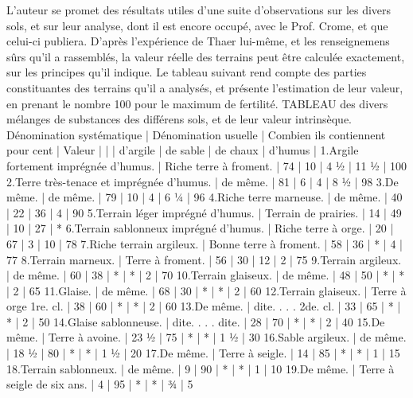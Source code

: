 L'auteur se promet des résultats utiles d'une suite d'observations sur les divers sols, et sur leur analyse, dont il est encore occupé, avec le Prof. Crome, et que celui-ci publiera. D'après l'expérience de Thaer lui-même, et les renseignemens sûrs qu'il a rassemblés, la valeur réelle des terrains peut être calculée exactement, sur les principes qu'il indique. Le tableau suivant rend compte des parties constituantes des terrains qu'il a analysés, et présente l'estimation de leur valeur, en prenant le nombre 100 pour le maximum de fertilité.\setcounter{page}{127} TABLEAU des divers mélanges de substances des différens sols, et de leur valeur intrinsèque.
Dénomination systématique | Dénomination usuelle | Combien ils contiennent pour cent | Valeur
| | | d'argile | de sable | de chaux | d'humus |
1.Argile fortement imprégnée d'humus. | Riche terre à froment. | 74 | 10 | 4 ½ | 11 ½ | 100
2.Terre très-tenace et imprégnée d'humus. | de même. | 81 | 6 | 4 | 8 ½ | 98
3.De même. | de même. | 79 | 10 | 4 | 6 ¼ | 96
4.Riche terre marneuse. | de même. | 40 | 22 | 36 | 4 | 90
5.Terrain léger imprégné d'humus. | Terrain de prairies. | 14 | 49 | 10 | 27 | *
6.Terrain sablonneux imprégné d'humus. | Riche terre à orge. | 20 | 67 | 3 | 10 | 78
7.Riche terrain argileux. | Bonne terre à froment. | 58 | 36 | * | 4 | 77
8.Terrain marneux. | Terre à froment. | 56 | 30 | 12 | 2 | 75
9.Terrain argileux. | de même. | 60 | 38 | * | * | 2 | 70
10.Terrain glaiseux. | de même. | 48 | 50 | * | * | 2 | 65
11.Glaise. | de même. | 68 | 30 | * | * | 2 | 60
12.Terrain glaiseux. | Terre à orge 1re. cl. | 38 | 60 | * | * | 2 | 60
13.De même. | dite. . . . 2de. cl. | 33 | 65 | * | * | 2 | 50
14.Glaise sablonneuse. | dite. . . . dite. | 28 | 70 | * | * | 2 | 40
15.De même. | Terre à avoine. | 23 ½ | 75 | * | * | 1 ½ | 30
16.Sable argileux. | de même. | 18 ½ | 80 | * | * | 1 ½ | 20
17.De même. | Terre à seigle. | 14 | 85 | * | * | 1 | 15
18.Terrain sablonneux. | de même. | 9 | 90 | * | * | 1 | 10
19.De même. | Terre à seigle de six ans. | 4 | 95 | * | * | ¾ | 5
